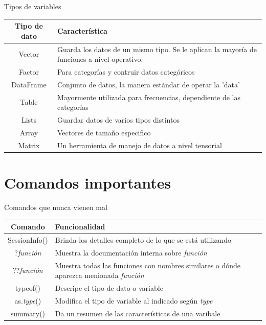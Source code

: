 \documentclass[aspectratio=169,xcolor=dvipsnames]{beamer}
\begin{document}
\begin{frame}{Tipos de variables}
        \begin{center}
        \begin{tabular}{|c|p{11cm}|}
            \hline
            \textbf{Tipo de dato} & \textbf{Característica} \\ \hline
            Vector & Guarda los datos de un mismo tipo. Se le aplican la mayoría de funciones a nivel operativo. \\ \hline
            Factor & Para categorías y contruir datos categóricos \\ \hline
            DataFrame & Conjunto de datos, la manera estándar de operar la 'data' \\ \hline
            Table & Mayormente utilizada para frecuencias, dependiente de las categorías \\ \hline
            Lists & Guardar datos de varios tipos distintos \\ \hline
            Array & Vectores de tamaño especifico \\ \hline
            Matrix & Un herramienta de manejo de datos a nivel tensorial \\
            \hline
        \end{tabular}
    \end{center}
\end{frame}

\section{Comandos importantes}

\begin{frame}{Comandos que nunca vienen mal}
    \begin{center}
        \begin{tabular}{|c|p{11cm}|}
            \hline
            \textbf{Comando} & \textbf{Funcionalidad} \\ \hline
            SessionInfo() & Brinda los detalles completo de lo que se está utilizando \\ \hline
            ?\textit{función} & Muestra la documentación interna sobre \textit{función} \\ \hline
            ??\textit{función} & Muestra todas las funciones con nombres similares o dónde 
                                aparezca menionada \textit{función} \\ \hline
            typeof() & Descripe el tipo de dato o variable \\ \hline
            as.\textit{type}() & Modifica el tipo de variable al indicado según \textit{type} \\ \hline
            summary() & Da un resumen de las características de una varibale\\ \hline
        \end{tabular}
    \end{center}

\end{frame}
\end{document}

